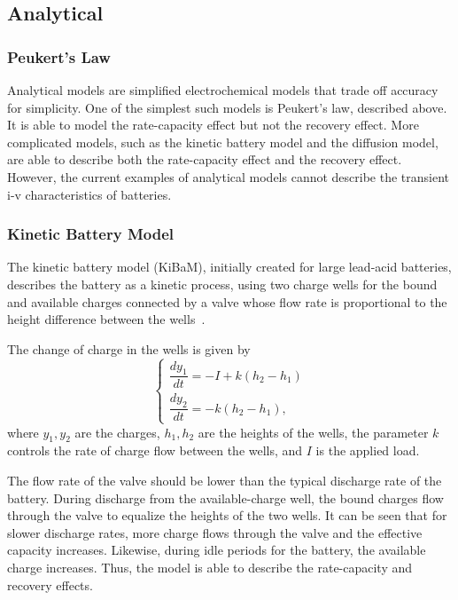 \documentclass[../zhang_thesis.tex]{subfiles}
\begin{document}
\subsection{Analytical}

\subsubsection{Peukert's Law}

Analytical models are simplified electrochemical models that trade off accuracy for simplicity. One of the simplest such models is Peukert's law, described above. It is able to model the rate-capacity effect but not the recovery effect. More complicated models, such as the kinetic battery model and the diffusion model, are able to describe both the rate-capacity effect and the recovery effect. However, the current examples of analytical models cannot describe the transient i-v characteristics of batteries.

\subsubsection{Kinetic Battery Model}

The kinetic battery model (KiBaM), initially created for large lead-acid batteries, describes the battery as a kinetic process, using two charge wells for the bound and available charges connected by a valve whose flow rate is proportional to the height difference between the wells~\cite{manwell93}. 

The change of charge in the wells is given by
\begin{equation}
    \begin{cases}
        \dfrac{dy_1}{dt} = -I + k \left( h_2 - h_1 \right) \\
        \dfrac{dy_2}{dt} = -k \left( h_2 - h_1 \right),
    \end{cases}
    \label{eq:kibam}
\end{equation}
where $y_1,y_2$ are the charges, $h_1,h_2$ are the heights of the wells, the parameter $k$ controls the rate of charge flow between the wells, and $I$ is the applied load.

The flow rate of the valve should be lower than the typical discharge rate of the battery. During discharge from the available-charge well, the bound charges flow through the valve to equalize the heights of the two wells. It can be seen that for slower discharge
rates, more charge flows through the valve and the effective capacity increases. Likewise, during idle periods for the battery, the available charge increases. Thus, the model is able to describe the rate-capacity and recovery effects.
\end{document}
